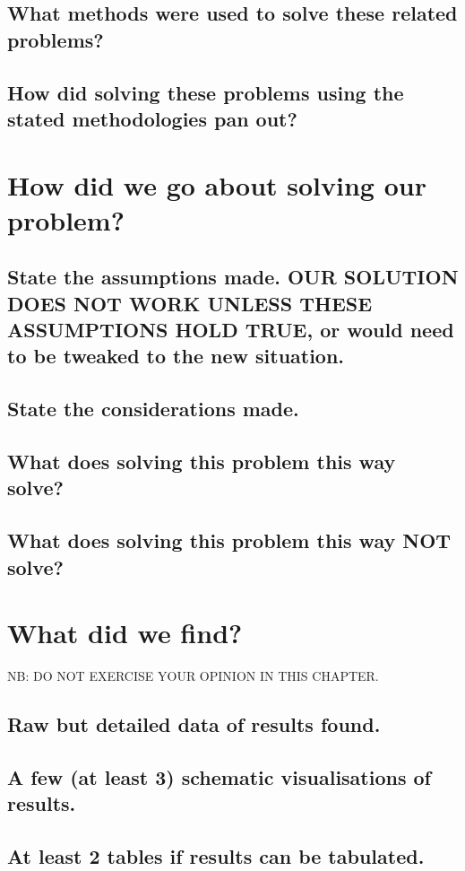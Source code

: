 \documentclass[]{report}
\begin{document}
\section{What methods were used to solve these related problems?}
\section{How did solving these problems using the stated methodologies pan out?}

\chapter{How did we go about solving our problem?}
\section{State the assumptions made. OUR SOLUTION DOES NOT WORK UNLESS THESE ASSUMPTIONS HOLD TRUE, or would need to be tweaked to the new situation.}
\section{State the considerations made.}
\section{What does solving this problem this way solve?}
\section{What does solving this problem this way NOT solve?}

\chapter{What did we find?}
NB: DO NOT EXERCISE YOUR OPINION IN THIS CHAPTER.
\section{Raw but detailed data of results found.}
\section{A few (at least 3) schematic visualisations of results.}
\section{At least 2 tables if results can be tabulated.}
\end{document}
